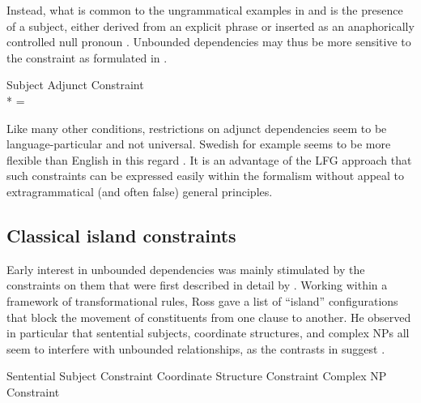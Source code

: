 \documentclass[output=paper,hidelinks]{langscibook}
\begin{document}
\ea\label{subadj}
\label{subjadj1}
\label{subjadj2}
\z\z

\noindent Instead, what is common to the ungrammatical examples in  and   is the presence of a subject, either derived from an explicit phrase  or inserted as an anaphorically controlled null pronoun .    Unbounded dependencies may thus be more sensitive to the constraint as formulated in .

\ea\label{sac}Subject Adjunct Constraint\\*
 = \kstar
\z

Like many other conditions, restrictions on adjunct dependencies seem to be language-particular and not universal.  Swedish for example seems to be more flexible than English in this regard  \citep[see][]{Muller19}.  It is an advantage of the LFG approach that such constraints can be expressed easily within the formalism without appeal to extragrammatical (and often false) general principles.


\subsection{Classical island constraints}\label{islands}  

Early interest in unbounded dependencies was mainly stimulated by the constraints on them that were first described in detail by \citet{ross1967constraints}. Working within a framework of transformational rules,  Ross gave a list of ``island'' configurations that block the movement of constituents from one clause to another. He observed in particular that sentential subjects, coordinate structures, and complex NPs all seem to interfere with unbounded relationships, as the contrasts in  suggest \citep[after][]{ross1967constraints}.

\ea\label{Ross} Sentential Subject Constraint
\label{firstssc}
\label{lastssc}
%
\sn\vspace{1ex}\hsp{-1.8em} Coordinate Structure Constraint
\label{firstcsc}
\label{csc2}
\label{lastcsc}
%
\sn\vspace{1ex}\hsp{-1.8em} Complex NP Constraint
\label{xfirstcnc}
\label{cnc2}
\label{lastcnc}
\z\z
\end{document}
